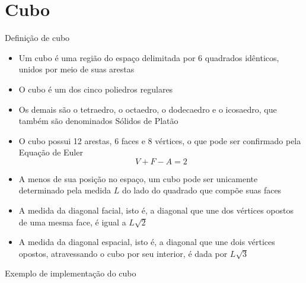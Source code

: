\section{Cubo}

\begin{frame}[fragile]{Definição de cubo}

    \begin{itemize}
        \item Um cubo é uma região do espaço delimitada por 6 quadrados idênticos, 
            unidos por meio de suas arestas
        \pause

        \item O cubo é um dos cinco poliedros regulares
        \pause

        \item Os demais são o tetraedro, o octaedro, o dodecaedro e o icosaedro, que também são
            denominados Sólidos de Platão
        \pause

        \item O cubo possui 12 arestas, 6 faces e 8 vértices,
            o que pode ser confirmado pela Equação de Euler
        \[
            V + F - A = 2
        \]
        \pause

        \item A menos de sua posição no espaço, um cubo pode ser unicamente determinado pela
            medida $L$ do lado do quadrado que compõe suas faces
        \pause

        \item A medida da diagonal facial, isto é, a diagonal que une dos vértices opostos de uma 
            mesma face, é igual a $L\sqrt{2}$
        \pause

        \item A medida da diagonal espacial, isto é, a diagonal que une dois vértices opostos,
            atravessando o cubo por seu interior, é dada por $L\sqrt{3}$

    \end{itemize}

\end{frame}

\begin{frame}[fragile]{Exemplo de implementação do cubo}
\end{frame}

